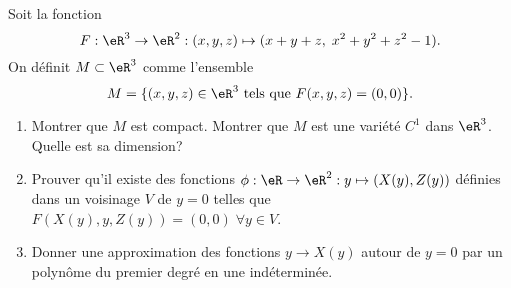 
\begin{exercice}\label{exoImplicite0008}

Soit la fonction 
\begin{equation}
	F:\eR^3\rightarrow\eR^2:(x,y,z)\mapsto(x+y+z,\; x^2+y^2+z^2-1).
\end{equation}
On définit $M\subset \eR^3$ comme l'ensemble
\begin{equation}
	M=\{(x,y,z)\in \eR^3 \mbox{ tels que } F(x,y,z)=(0,0)\}.
\end{equation}

\begin{enumerate}
\item Montrer que $M$ est compact. Montrer que $M$ est une variété $C^1$ dans $\eR^3$. Quelle est sa dimension?
\item Prouver qu'il existe des fonctions $\phi:\eR\rightarrow \eR^2 : y \mapsto (X(y), Z(y))$ définies dans un voisinage $V$ de $y=0$ telles que $F(X(y), y, Z(y))=(0,0) \; \forall y \in V$. 
\item Donner une approximation des   fonctions $y\rightarrow X(y)$ autour de $y=0$ par un polynôme  du premier degré en une indéterminée.   
\end{enumerate}

\end{exercice}
